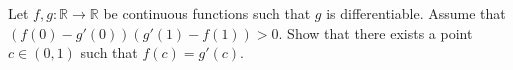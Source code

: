 Let \(f,g\colon \mathbb R\to\mathbb R\) be continuous functions such that \(g\) is differentiable. Assume that \((f(0)-g'(0))(g'(1)-f(1))>0\). Show that there exists a point \(c\in (0,1)\) such that \(f(c)=g'(c)\).

